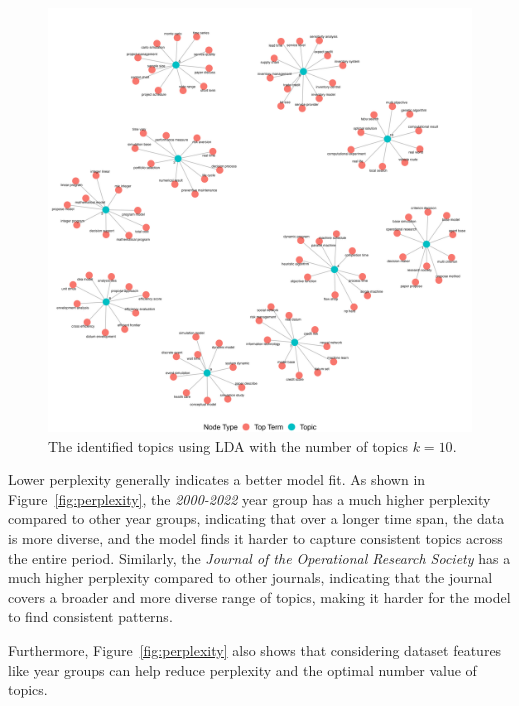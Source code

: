 \documentclass[9pt,twocolumn,twoside]{pnas-new}
\begin{document}
\begin{figure}[!tbhp]
\centering

\includegraphics[width=0.9\linewidth]{bag_words/Topics_LDAk6.png}


\caption{The identified topics using LDA with the number of topics $k = 10$.}
\label{fig:perplexityk6}
\end{figure}




Lower perplexity generally indicates a better model fit. As shown in Figure~\ref{fig:perplexity}, the \textit{2000-2022} year group has a much higher perplexity compared to other year groups, indicating that over a longer time span, the data is more diverse, and the model finds it harder to capture consistent topics across the entire period. Similarly, the \textit{Journal of the Operational Research Society} has a much higher perplexity compared to other journals, indicating that the journal covers a broader and more diverse range of topics, making it harder for the model to find consistent patterns.

Furthermore, Figure~\ref{fig:perplexity} also shows that considering dataset features like year groups can help reduce perplexity and the optimal number value of topics. 
\end{document}
